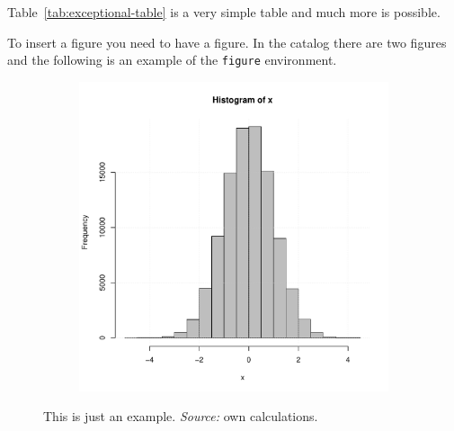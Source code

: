\documentclass[english, twoside, 12pt, a4paper]{article}
\theoremstyle{definition}
\theoremstyle{plain}
\theoremstyle{remark}
\begin{document}
Table~\ref{tab:exceptional-table} is a very simple table and much more is possible.

To insert a figure you need to have a figure. In the catalog there are two figures and the following is an example of the \verb+figure+ environment.

\begin{figure}[hbt]
  \centering

  \begin{subfigure}[t]{0.45\textwidth}
  \includegraphics[width=\textwidth]{./figure-1}
  \end{subfigure}

  \captionsetup{margin=10pt,font=small,labelfont=bf,width=.8\textwidth}

  \caption[Short name]{This is just an example. \textit{Source:} own calculations.}\label{fig:xxx1}
\end{figure}
\end{document}
